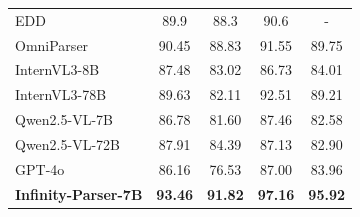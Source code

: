 \begin{table}[h]
\begin{minipage}[t]{0.5\textwidth}
{\begin{tabular}{lcccc}
      EDD & 89.9 & 88.3 & 90.6 & - \\
    OmniParser & 90.45 & 88.83 & 91.55 & 89.75 \\
    InternVL3-8B & 87.48 & 83.02 & 86.73 & 84.01 \\
    InternVL3-78B & 89.63 & 82.11 & 92.51 & 89.21 \\
    Qwen2.5-VL-7B & 86.78 & 81.60 & 87.46 & 82.58 \\
    Qwen2.5-VL-72B & 87.91 & 84.39 & 87.13 & 82.90 \\
    GPT-4o & 86.16 & 76.53 & 87.00 & 83.96 \\
      \midrule
      \textbf{Infinity-Parser-7B} & \textbf{93.46} & \textbf{91.82} & \textbf{97.16} & \textbf{95.92} \\
      \bottomrule
    \end{tabular}%
    }
    \label{tab:teds_grouped_comparison}
  \end{minipage}
\end{table}






